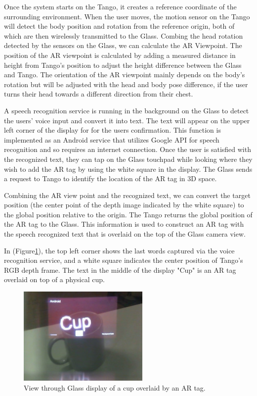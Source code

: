 Once the system starts on the Tango, it creates a reference coordinate of the surrounding environment. When the user moves, the motion sensor on the Tango will detect the body  position and rotation from the reference origin, both of which are then wirelessly transmitted to the Glass. Combing the head rotation detected by the sensors on the Glass, we can calculate the AR Viewpoint. The position of the AR viewpoint is calculated by adding a measured distance in height from Tango's position to adjust the height difference between the Glass and Tango. The orientation of the AR viewpoint mainly depends on the body's rotation but will be adjusted with the head and body pose difference, if the user turns their head towards a different direction from their chest. 

A speech recognition service is running in the background on the Glass to detect the users' voice input and convert it into text. The text will appear on the upper left corner of the display for for the users confirmation. This function is implemented as an Android service that utilizes Google API for speech recognition and so requires an internet connection. Once the user is satisfied with the recognized text, they can tap on the Glass touchpad while looking where they wish to add the AR tag by using the white square in the display. The Glass sends a request to Tango to identify the location of the AR tag in 3D space.

Combining the AR view point and the recognized text, we can convert the target position (the center point of the depth image indicated by the white square) to the global position relative to the origin. The Tango returns the global position of the AR tag to the Glass. This information is used to construct an AR tag with the speech recognized text that is overlaid on the top of the Glass camera view.

In (Figure\ref{fig:mgia16:ui}), the top left corner shows the last words captured via the voice recognition service, and a white square indicates the center position of Tango's RGB depth frame. The text in the middle of the display "Cup" is an AR tag overlaid on top of a physical cup. 
%
%

\begin{figure}[ht]
  \centering
  \includegraphics[width=2.5in]{images/mgia16/WIN_20150614_204531_2}
  \caption{View through Glass display of a cup overlaid by an AR tag.}
  \label{fig:mgia16:ui}
\end{figure}


